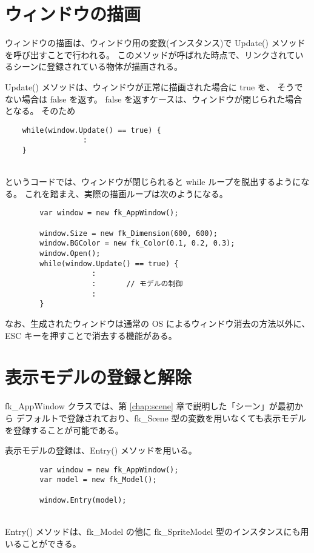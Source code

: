 \section{ウィンドウの描画}
ウィンドウの描画は、ウィンドウ用の変数(インスタンス)で Update() メソッドを呼び出すことで行われる。
このメソッドが呼ばれた時点で、リンクされているシーンに登録されている物体が描画される。

Update() メソッドは、ウィンドウが正常に描画された場合に true を、
そうでない場合は false を返す。
false を返すケースは、ウィンドウが閉じられた場合となる。
そのため
\\
\begin{screen}
\begin{verbatim}
    while(window.Update() == true) {
                  :
    }
\end{verbatim}
\end{screen}
~ \\
というコードでは、ウィンドウが閉じられると while ループを脱出するようになる。
これを踏まえ、実際の描画ループは次のようになる。
\\
\begin{breakbox}
\begin{verbatim}
        var window = new fk_AppWindow();

        window.Size = new fk_Dimension(600, 600);
        window.BGColor = new fk_Color(0.1, 0.2, 0.3);
        window.Open();
        while(window.Update() == true) {
                    :
                    :       // モデルの制御
                    :
        }       
\end{verbatim}
\end{breakbox}

なお、生成されたウィンドウは通常の OS によるウィンドウ消去の方法以外に、
ESC キーを押すことで消去する機能がある。

\section{表示モデルの登録と解除}
fk\_AppWindow クラスでは、第 \ref{chap:scene} 章で説明した「シーン」が最初から
デフォルトで登録されており、fk\_Scene 型の変数を用いなくても表示モデルを登録することが可能である。

表示モデルの登録は、Entry() メソッドを用いる。
\\
\begin{breakbox}
\begin{verbatim}
        var window = new fk_AppWindow();
        var model = new fk_Model();

        window.Entry(model);
\end{verbatim}
\end{breakbox}
~ \\
Entry() メソッドは、fk\_Model の他に fk\_SpriteModel 型のインスタンスにも用いることができる。

